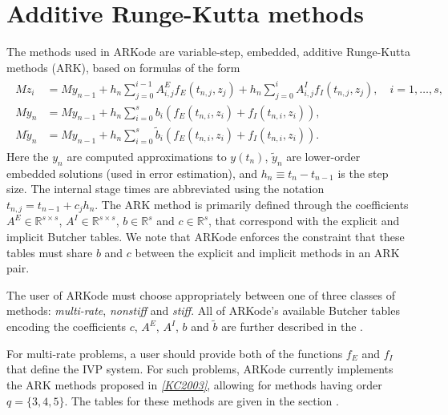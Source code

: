 \documentclass[letterpaper,10pt,english]{sphinxmanual}
\begin{document}
\section{Additive Runge-Kutta methods}
\label{Mathematics:mathematics-ark}\label{Mathematics:additive-runge-kutta-methods}
The methods used in ARKode are variable-step, embedded,
additive Runge-Kutta methods (ARK), based on formulas of the
form
\label{Mathematics:equation-ARK}\begin{gather}
\begin{split}M z_i &= M y_{n-1} + h_n \sum_{j=0}^{i-1} A^E_{i,j} f_E(t_{n,j}, z_j)
              + h_n \sum_{j=0}^{i}   A^I_{i,j} f_I(t_{n,j}, z_j),
\quad i=1,\ldots,s, \\
M y_n &= M y_{n-1} + h_n \sum_{i=0}^{s} b_i \left(f_E(t_{n,i}, z_i)
              + f_I(t_{n,i}, z_i)\right), \\
M \tilde{y}_n &= M y_{n-1} + h_n \sum_{i=0}^{s} \tilde{b}_i
    \left(f_E(t_{n,i}, z_i) + f_I(t_{n,i}, z_i)\right).\end{split}\label{Mathematics-ARK}
\end{gather}
Here the \(y_n\) are computed approximations to \(y(t_n)\),
\(\tilde{y}_n\) are lower-order embedded solutions (used in error
estimation), and \(h_n \equiv t_n - t_{n-1}\) is the step size.
The internal stage times are abbreviated using the notation
\(t_{n,j} = t_{n-1} + c_j h_n\).  The ARK method is primarily
defined through the coefficients \(A^E \in \mathbb{R}^{s\times s}\),
\(A^I \in \mathbb{R}^{s\times s}\), \(b \in \mathbb{R}^{s}\) and
\(c \in \mathbb{R}^{s}\), that correspond with the explicit and
implicit Butcher tables.  We note that ARKode enforces the constraint
that these tables must share \(b\) and \(c\) between the
explicit and implicit methods in an ARK pair.

The user of ARKode must choose appropriately between one of three
classes of methods: \emph{multi-rate}, \emph{nonstiff} and \emph{stiff}.  All of
ARKode's available Butcher tables encoding the coefficients \(c\),
\(A^E\), \(A^I\), \(b\) and \(\tilde{b}\) are further
described in the {\hyperref[Butcher:butcher]{\emph{}}}.

For multi-rate problems, a user should provide both of the functions
\(f_E\) and \(f_I\) that define the IVP system.  For such
problems, ARKode currently implements the ARK methods proposed in
\label{Mathematics:id1}{\hyperref[References:kc2003]{\emph{{[}KC2003{]}}}}, allowing for methods having order \(q = \{3,4,5\}\).
The tables for these methods are given in the section
{\hyperref[Butcher:butcher-additive]{\emph{}}}.
\end{document}
